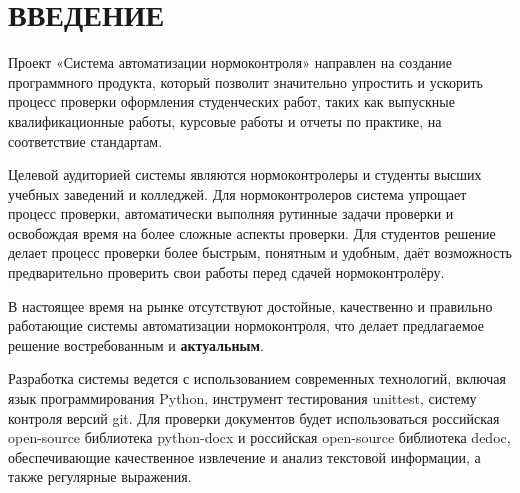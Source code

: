 \documentclass{report}
\begin{document}



\setcounter{page}{2} %
\tableofcontents  %

\setcounter{chapter}{0} %
\setcounter{section}{0} %
\setcounter{subsection}{0} %
\setcounter{equation}{0} %


\chapter*{ВВЕДЕНИЕ} %

Проект «Система автоматизации нормоконтроля» направлен на создание программного продукта, который позволит значительно упростить и ускорить процесс проверки оформления студенческих работ, таких как выпускные квалификационные работы, курсовые работы и отчеты по практике, на соответствие стандартам.

Целевой аудиторией системы являются нормоконтролеры и студенты высших учебных заведений и колледжей. Для нормоконтролеров система упрощает процесс проверки, автоматически выполняя рутинные задачи проверки и освобождая время на более сложные аспекты проверки. Для студентов решение делает процесс проверки более быстрым, понятным и удобным, даёт возможность предварительно проверить свои работы перед сдачей нормоконтролёру. 

В настоящее время на рынке отсутствуют достойные, качественно и правильно работающие системы автоматизации нормоконтроля, что делает предлагаемое решение востребованным и \textbf{актуальным}.

Разработка системы ведется с использованием современных технологий, включая язык программирования Python, инструмент тестирования unittest, систему контроля версий git. Для проверки документов будет использоваться российская open-source библиотека python-docx и российская open-source библиотека dedoc, обеспечивающие качественное извлечение и анализ текстовой информации, а также регулярные выражения.
\end{document}

